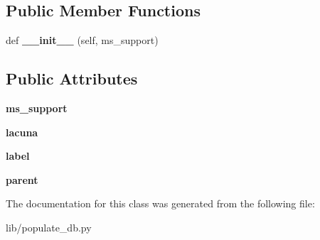 \subsection*{Public Member Functions}
\begin{DoxyCompactItemize}
\item 
\mbox{\label{classCBGM_1_1lib_1_1populate__db_1_1LacunaReading_ae25c571aaedc386b6dbd7d47519e7a77}} 
def {\bfseries \+\_\+\+\_\+init\+\_\+\+\_\+} (self, ms\+\_\+support)
\end{DoxyCompactItemize}
\subsection*{Public Attributes}
\begin{DoxyCompactItemize}
\item 
\mbox{\label{classCBGM_1_1lib_1_1populate__db_1_1LacunaReading_a9dee86d1c5d3038a558a19bae68441f1}} 
{\bfseries ms\+\_\+support}
\item 
\mbox{\label{classCBGM_1_1lib_1_1populate__db_1_1LacunaReading_aa5ff880f1b08148a0a501de8b122d339}} 
{\bfseries lacuna}
\item 
\mbox{\label{classCBGM_1_1lib_1_1populate__db_1_1LacunaReading_a01aff5f0b155914358808f71bc46f673}} 
{\bfseries label}
\item 
\mbox{\label{classCBGM_1_1lib_1_1populate__db_1_1LacunaReading_aa6df67676588419c56ec7a8f58d4a382}} 
{\bfseries parent}
\end{DoxyCompactItemize}


The documentation for this class was generated from the following file\+:\begin{DoxyCompactItemize}
\item 
lib/populate\+\_\+db.\+py\end{DoxyCompactItemize}

